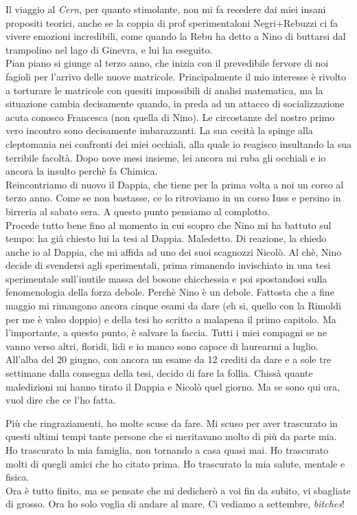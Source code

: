 Il viaggio al \emph{Cern}, per quanto stimolante, non mi fa recedere dai miei insani propositi teorici, anche se la coppia di prof sperimentaloni Negri+Rebuzzi ci fa vivere emozioni incredibili, come quando la Rebu ha detto a Nino di buttarsi dal trampolino nel lago di Ginevra, e lui ha eseguito.\\
Pian piano si giunge al terzo anno, che inizia con il prevedibile fervore di noi fagioli per l'arrivo delle nuove matricole. Principalmente il mio interesse \`e rivolto a torturare le matricole con quesiti impossibili di analisi matematica, ma la situazione cambia decisamente quando, in preda ad un attacco di socializzazione acuta conosco Francesca (non quella di Nino). Le circostanze del nostro primo vero incontro sono decisamente imbarazzanti. La sua cecit\`a la spinge alla cleptomania nei confronti dei miei occhiali, alla quale io reagisco insultando la sua terribile facolt\`a. Dopo nove mesi insieme, lei ancora mi ruba gli occhiali e io ancora la insulto perch\`e fa Chimica.\\
Reincontriamo di nuovo il Dappia, che tiene per la prima volta a noi un corso al terzo anno. Come se non bastasse, ce lo ritroviamo in un corso Iuss e persino in birreria al sabato sera. A questo punto pensiamo al complotto.\\
Procede tutto bene fino al momento in cui scopro che Nino mi ha battuto sul tempo: ha gi\`a chiesto lui la tesi al Dappia. Maledetto. Di reazione, la chiedo anche io al Dappia, che mi affida ad uno dei suoi scagnozzi Nicol\`o. Al ch\`e, Nino decide di svendersi agli sperimentali, prima rimanendo invischiato in una tesi sperimentale sull'inutile massa del bosone chicchessia e poi spostandosi sulla fenomenologia della forza debole. Perch\`e Nino \`e un debole. Fattosta che a fine maggio mi rimangono ancora cinque esami da dare (eh si, quello con la Rimoldi per me \`e valso doppio) e della tesi ho scritto a malapena il primo capitolo. Ma l'importante, a questo punto, \`e salvare la faccia. Tutti i miei compagni se ne vanno verso altri, floridi, lidi e io manco sono capace di laurearmi a luglio. All'alba del 20 giugno, con ancora un esame da 12 crediti da dare e a sole tre settimane dalla consegna della tesi, decido di fare la follia. Chiss\`a quante maledizioni mi hanno tirato il Dappia e Nicol\`o quel giorno. Ma se sono qui ora, vuol dire che ce l'ho fatta.\\
\thispagestyle{plain}

\noindent Pi\`u che ringraziamenti, ho molte scuse da fare. Mi scuso per aver trascurato in questi ultimi tempi tante persone che si meritavano molto di pi\`u da parte mia. Ho trascurato la mia famiglia, non tornando a casa quasi mai. Ho trascurato molti di quegli amici che ho citato prima. Ho trascurato la mia salute, mentale e fisica.\\ Ora \`e tutto finito, ma se pensate che mi dedicher\`o a voi fin da subito, vi sbagliate di grosso. Ora ho solo voglia di andare al mare. Ci vediamo a settembre, \emph{bitches}!
\thispagestyle{plain}










